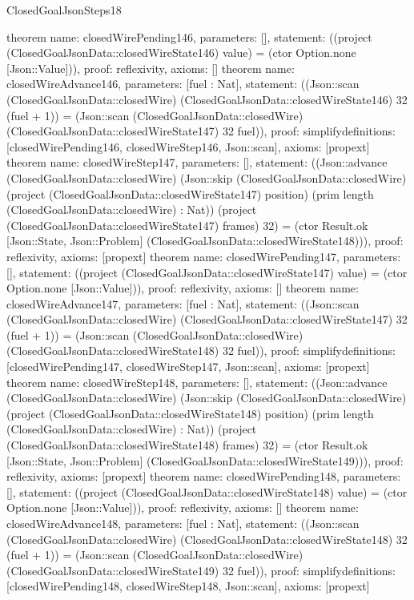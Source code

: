 \begin{lexlean}{ClosedGoalJsonSteps18}
\begin{semanticmodule}
{}
theorem{
 name: closedWirePending146, parameters: [],
 statement: ((project (ClosedGoalJsonData::closedWireState146) value) = (ctor Option.none [Json::Value])), proof: reflexivity{}, axioms: []
}
theorem{
 name: closedWireAdvance146, parameters: [fuel : Nat],
 statement: ((Json::scan (ClosedGoalJsonData::closedWire) (ClosedGoalJsonData::closedWireState146) 32 (fuel + 1)) = (Json::scan (ClosedGoalJsonData::closedWire) (ClosedGoalJsonData::closedWireState147) 32 fuel)), proof: simplify{definitions: [closedWirePending146, closedWireStep146, Json::scan]}, axioms: [propext]
}
theorem{
 name: closedWireStep147, parameters: [],
 statement: ((Json::advance (ClosedGoalJsonData::closedWire) (Json::skip (ClosedGoalJsonData::closedWire) (project (ClosedGoalJsonData::closedWireState147) position) (prim length (ClosedGoalJsonData::closedWire) : Nat)) (project (ClosedGoalJsonData::closedWireState147) frames) 32) = (ctor Result.ok [Json::State, Json::Problem] (ClosedGoalJsonData::closedWireState148))), proof: reflexivity{}, axioms: [propext]
}
theorem{
 name: closedWirePending147, parameters: [],
 statement: ((project (ClosedGoalJsonData::closedWireState147) value) = (ctor Option.none [Json::Value])), proof: reflexivity{}, axioms: []
}
theorem{
 name: closedWireAdvance147, parameters: [fuel : Nat],
 statement: ((Json::scan (ClosedGoalJsonData::closedWire) (ClosedGoalJsonData::closedWireState147) 32 (fuel + 1)) = (Json::scan (ClosedGoalJsonData::closedWire) (ClosedGoalJsonData::closedWireState148) 32 fuel)), proof: simplify{definitions: [closedWirePending147, closedWireStep147, Json::scan]}, axioms: [propext]
}
theorem{
 name: closedWireStep148, parameters: [],
 statement: ((Json::advance (ClosedGoalJsonData::closedWire) (Json::skip (ClosedGoalJsonData::closedWire) (project (ClosedGoalJsonData::closedWireState148) position) (prim length (ClosedGoalJsonData::closedWire) : Nat)) (project (ClosedGoalJsonData::closedWireState148) frames) 32) = (ctor Result.ok [Json::State, Json::Problem] (ClosedGoalJsonData::closedWireState149))), proof: reflexivity{}, axioms: [propext]
}
theorem{
 name: closedWirePending148, parameters: [],
 statement: ((project (ClosedGoalJsonData::closedWireState148) value) = (ctor Option.none [Json::Value])), proof: reflexivity{}, axioms: []
}
theorem{
 name: closedWireAdvance148, parameters: [fuel : Nat],
 statement: ((Json::scan (ClosedGoalJsonData::closedWire) (ClosedGoalJsonData::closedWireState148) 32 (fuel + 1)) = (Json::scan (ClosedGoalJsonData::closedWire) (ClosedGoalJsonData::closedWireState149) 32 fuel)), proof: simplify{definitions: [closedWirePending148, closedWireStep148, Json::scan]}, axioms: [propext]
}
\end{semanticmodule}
\end{lexlean}
